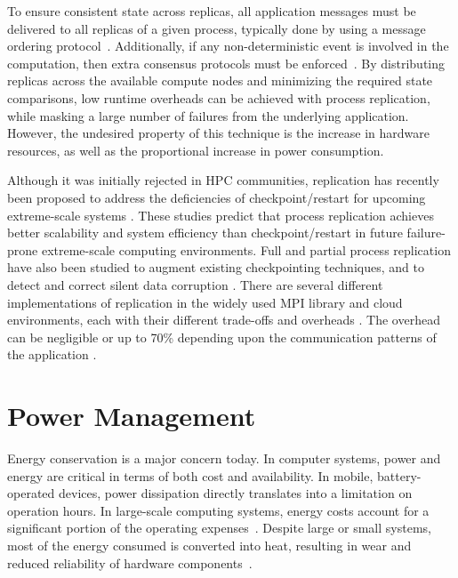 To ensure consistent state across replicas, all application messages must be delivered to all replicas of a given process, typically done by using a message ordering protocol~\cite{defago2004total,baldoni2005total}. Additionally, if any non-deterministic event is involved in the computation,  then extra consensus protocols must be enforced~\cite{lamport1998part,zhao2010fault}. 
By distributing replicas across the available compute nodes and minimizing the required state comparisons, low runtime overheads can be achieved with process replication, while masking a large number of failures from the underlying application. However, the undesired property of this technique is the increase in hardware resources, as well as the proportional increase in power consumption.


Although it was initially rejected in HPC communities, 
replication has recently been proposed to address the deficiencies of checkpoint/restart for upcoming extreme-scale systems \cite{Cappello:09:Fault,engelmann2011redundant,riesen_sandia_2010,ferreira_sc_2011}. These studies predict that process replication achieves better scalability and system efficiency than checkpoint/restart in future failure-prone extreme-scale computing environments. 
Full and partial
process replication have also been studied to augment existing checkpointing techniques, and to  
detect and correct silent data corruption \cite{stearly_2012_partial,elliott_2012_cpr,ferreira_sc_2011,fiala_2012_sdc,ni_2013_acr,lefray_2013_rsd}. There are several different implementations of
replication in the widely used MPI library and cloud environments, each with their different trade-offs and overheads \cite{engelmann2011redundant,ferreira_sc_2011,zhao2010fault}. The
overhead can be negligible or up to 70\% depending upon the communication patterns of the
application \cite{engelmann2011redundant}. %



\section{Power Management}
Energy conservation is a major concern today. In computer systems, power and energy are critical in terms of both cost and availability. In mobile, battery-operated devices, power dissipation directly translates into a limitation on operation hours. In large-scale computing systems, energy costs account for a significant portion of the operating expenses~\cite{scaramella2014worldwide}. Despite large or small systems, most of the energy consumed is converted into heat, resulting in wear and reduced reliability of hardware components~\cite{sarood_2013_CWI,Albers:2010:EA:1735223.1735245}.


